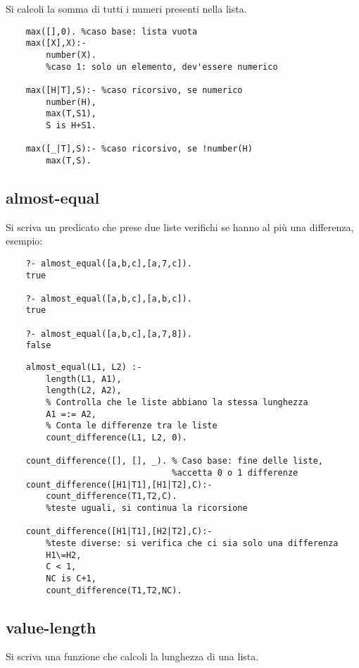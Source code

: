 Si calcoli la somma di tutti i numeri presenti nella lista.

\begin{lstlisting}
    max([],0). %caso base: lista vuota
    max([X],X):- 
        number(X). 
    	%caso 1: solo un elemento, dev'essere numerico
    
    max([H|T],S):- %caso ricorsivo, se numerico
        number(H),
        max(T,S1),
        S is H+S1.
    
    max([_|T],S):- %caso ricorsivo, se !number(H)
        max(T,S).
\end{lstlisting}

\subsection{almost-equal}

Si scriva un predicato che prese due liste verifichi se hanno al più una differenza, esempio:

\begin{lstlisting}
    ?- almost_equal([a,b,c],[a,7,c]).
    true

    ?- almost_equal([a,b,c],[a,b,c]).
    true

    ?- almost_equal([a,b,c],[a,7,8]).
    false
\end{lstlisting}

\begin{lstlisting}
    almost_equal(L1, L2) :-
        length(L1, A1),
        length(L2, A2),
        % Controlla che le liste abbiano la stessa lunghezza
        A1 =:= A2,
        % Conta le differenze tra le liste
        count_difference(L1, L2, 0). 
        
    count_difference([], [], _). % Caso base: fine delle liste,
                                 %accetta 0 o 1 differenze
    count_difference([H1|T1],[H1|T2],C):-
        count_difference(T1,T2,C). 
        %teste uguali, si continua la ricorsione
    
    count_difference([H1|T1],[H2|T2],C):-
        %teste diverse: si verifica che ci sia solo una differenza
        H1\=H2,
        C < 1,
        NC is C+1,
        count_difference(T1,T2,NC).
\end{lstlisting}

\subsection{value-length}

Si scriva una funzione che calcoli la lunghezza di una lista.

